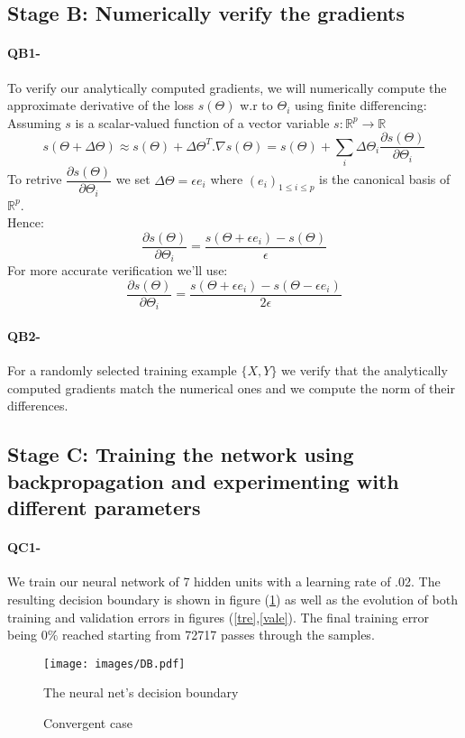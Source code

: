\documentclass[11pt]{article}
\newcommand{\R}{\mathbb{R}}
\newcommand{\1}{\mathbbm{1}}
\newcommand{\0}{\mathbf{0}}
\begin{document}
\subsection*{Stage B: Numerically verify the gradients}
	\paragraph{QB1-}
		To verify our analytically computed gradients, we will numerically compute the approximate derivative of the loss $s(\Theta)$ w.r to $\Theta_i$ using finite differencing:\\
		Assuming $s$ is a scalar-valued function of a vector variable  $s:\R^p\to\R$
		\[s(\Theta+\Delta\Theta)\approx s(\Theta)+\Delta\Theta^T.\nabla s(\Theta)=s(\Theta)+\sum_i\Delta\Theta_i\frac{\partial s(\Theta)}{\partial \Theta_i}\]
		To retrive $\dfrac{\partial s(\Theta)}{\partial \Theta_i}$ we set $\Delta\Theta=\epsilon e_i$ where $(e_i)_{1\leq i\leq p}$ is the canonical basis of $\R^p$.\\
		Hence: 
		\[\frac{\partial s(\Theta)}{\partial \Theta_i}=\frac{s(\Theta+\epsilon e_i)-s(\Theta)}{\epsilon}\]
		For more accurate verification we'll use:
		\[\frac{\partial s(\Theta)}{\partial \Theta_i}=\frac{s(\Theta+\epsilon e_i)-s(\Theta-\epsilon e_i)}{2\epsilon}\]

	\paragraph{QB2-}
		For a randomly selected training example $\{X,Y\}$ we verify that the analytically computed gradients match the numerical ones and we compute the norm of their differences.
		
\subsection*{Stage C: Training the network using backpropagation and experimenting with different parameters}
	\paragraph{QC1-}
		We train our neural network of 7 hidden units with a learning rate of .02. The resulting decision boundary is shown in figure (\ref{DB}) as well as the evolution of both training and validation errors in figures (\ref{tre},\ref{vale}). The final training error being $0\%$ reached starting from 72717 passes through the samples.
		\begin{figure}[H]
			\centering
			\texttt{[image: images/DB.pdf]}
			\caption{The neural net's decision boundary\label{DB}}
		\end{figure}
		\begin{figure}[H]
			\centering
			\caption{Convergent case}
		\end{figure}
\end{document}
